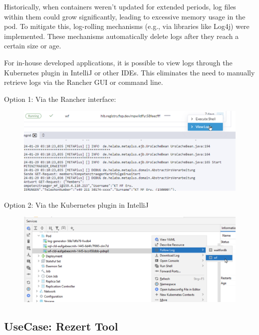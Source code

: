 \documentclass[../main.tex]{subfiles}
\begin{document}
Historically, when containers weren’t updated for extended periods, log files within them could grow significantly, leading to excessive memory usage in the pod. To mitigate this, log-rolling mechanisms (e.g., via libraries like Log4j) were implemented. These mechanisms automatically delete logs after they reach a certain size or age.

For in-house developed applications, it is possible to view logs through the Kubernetes plugin in IntelliJ or other IDEs. This eliminates the need to manually retrieve logs via the Rancher GUI or command line. 

Option 1: Via the Rancher interface:

\begin{figure}[h]
        \centering
        \includegraphics[scale=0.8]{img/2-background/gitlab/rancher_logs_gui.png}
        \caption{}
        \label{fig:rancher_logs_gui}
    \end{figure}

Option 2: Via the Kubernetes plugin in IntelliJ

\begin{figure}[h]
        \centering
        \includegraphics[scale=0.8]{img/2-background/gitlab/logs_plugin.png}
        \caption{}
        \label{fig:logs_plugin}
    \end{figure}

\subsection{UseCase: Rezert Tool}
\end{document}
